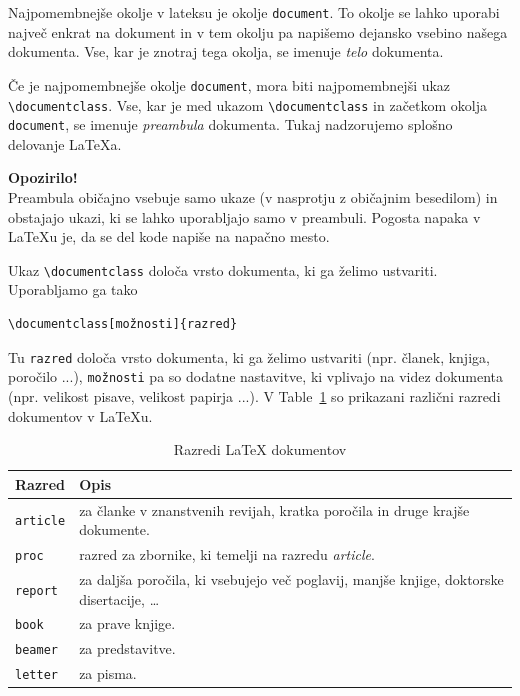Najpomembnejše okolje v lateksu je okolje \texttt{document}.
To okolje se lahko uporabi največ enkrat na dokument in v tem okolju pa napišemo dejansko vsebino našega dokumenta.
Vse, kar je znotraj tega okolja, se imenuje \textit{telo} dokumenta.

Če je najpomembnejše okolje \texttt{document}, mora biti najpomembnejši ukaz \texttt{{\textbackslash}documentclass}.
Vse, kar je med ukazom \texttt{{\textbackslash}documentclass} in začetkom okolja \texttt{document}, se imenuje \textit{preambula} dokumenta.
Tukaj nadzorujemo splošno delovanje LaTeXa.

\begin{framed}
\textbf{Opozirilo!}\\
Preambula običajno vsebuje samo ukaze (v nasprotju z običajnim besedilom) in obstajajo ukazi, ki se lahko uporabljajo samo v preambuli.
Pogosta napaka v LaTeXu je, da se del kode napiše na napačno mesto.
\end{framed}

Ukaz \texttt{{\textbackslash}documentclass} določa vrsto dokumenta, ki ga želimo ustvariti.
Uporabljamo ga tako

\begin{verbatim}
\documentclass[možnosti]{razred}
\end{verbatim}

Tu \texttt{razred} določa vrsto dokumenta, ki ga želimo ustvariti (npr. članek, knjiga, poročilo ...), \texttt{možnosti} pa so dodatne nastavitve, ki vplivajo na videz dokumenta (npr. velikost pisave, velikost papirja ...). V Table~\ref{tab_latex_razredi} so prikazani različni razredi dokumentov v LaTeXu.

\begin{table}
\centering
\caption[]{Razredi LaTeX dokumentov}
\label{tab_latex_razredi}
\begin{tabular}{p{}p{}}
\toprule
Razred & Opis \\
\hline
\texttt{article} & za članke v znanstvenih revijah, kratka poročila in druge krajše dokumente. \\
\texttt{proc} & razred za zbornike, ki temelji na razredu \textit{article}. \\
\texttt{report} & za daljša poročila, ki vsebujejo več poglavij, manjše knjige, doktorske disertacije, \dots \\
\texttt{book} & za prave knjige. \\
\texttt{beamer} & za predstavitve. \\
\texttt{letter} & za pisma. \\
\bottomrule
\end{tabular}
\end{table}


